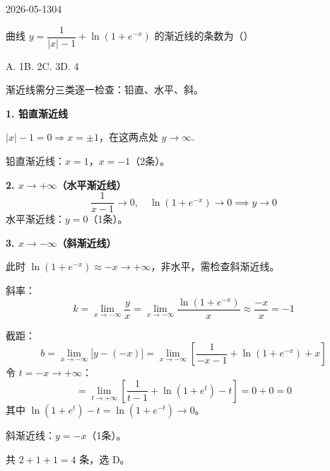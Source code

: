 \begin{mistake}{2026-05-13}{04}

\begin{problemcontent}
曲线 \( y = \dfrac{1}{|x|-1} + \ln(1+e^{-x}) \) 的渐近线的条数为（\quad）

A. 1\qquad B. 2\qquad C. 3\qquad D. 4
\end{problemcontent}

\begin{solutioncontent}
渐近线需分三类逐一检查：铅直、水平、斜。

\textbf{1. 铅直渐近线}

\( |x|-1=0 \Rightarrow x=\pm1 \)，在这两点处 \( y\to\infty \).

铅直渐近线：\( x=1 \)，\( x=-1 \)（2条）。

\textbf{2. \( x\to+\infty \)（水平渐近线）}
\[
\frac{1}{x-1}\to 0,\quad \ln(1+e^{-x})\to 0 \implies y\to 0
\]
水平渐近线：\( y=0 \)（1条）。

\textbf{3. \( x\to-\infty \)（斜渐近线）}

此时 \( \ln(1+e^{-x})\approx -x\to+\infty \)，非水平，需检查斜渐近线。

斜率：
\[
k = \lim_{x\to-\infty}\frac{y}{x} = \lim_{x\to-\infty}\frac{\ln(1+e^{-x})}{x} \approx \frac{-x}{x} = -1
\]

截距：
\[
b = \lim_{x\to-\infty}\bigl[y-(-x)\bigr] = \lim_{x\to-\infty}\left[\frac{1}{-x-1}+\ln(1+e^{-x})+x\right]
\]
令 \( t=-x\to+\infty \)：
\[
= \lim_{t\to+\infty}\left[\frac{1}{t-1}+\ln(1+e^{t})-t\right] = 0 + 0 = 0
\]
其中 \( \ln(1+e^t)-t = \ln(1+e^{-t})\to 0 \)。

斜渐近线：\( y=-x \)（1条）。

共 \( 2+1+1=4 \) 条，选 D。
\end{solutioncontent}


\end{mistake}
